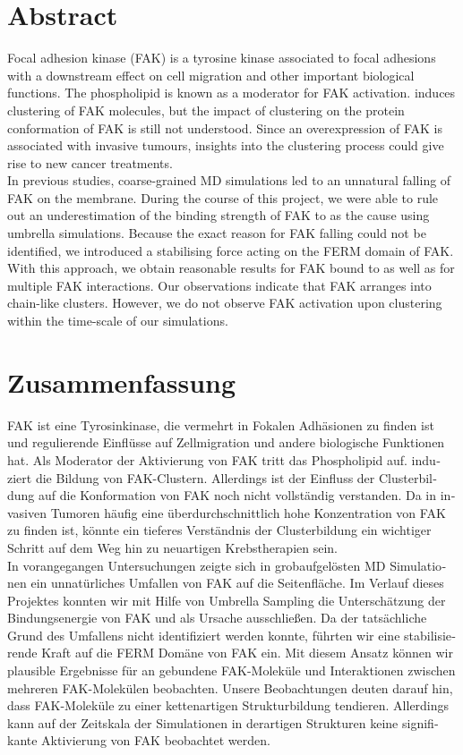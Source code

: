 \chapter*{Abstract}
Focal adhesion kinase (FAK) is a tyrosine kinase associated to focal adhesions with a downstream effect on cell migration and other important biological functions. The phospholipid \pip{} is known as a moderator for FAK activation. \pip{} induces clustering of FAK molecules, but the impact of clustering on the protein conformation of FAK is still not understood. Since an overexpression of FAK is associated with invasive tumours, insights into the clustering process could give rise to new cancer treatments.\\
In previous studies, coarse-grained MD simulations led to an unnatural falling of FAK on the membrane. During the course of this project, we were able to rule out an underestimation of the binding strength of FAK to \pip{} as the cause using umbrella simulations. Because the exact reason for FAK falling could not be identified, we introduced a stabilising force acting on the FERM domain of FAK. With this approach, we obtain reasonable results for FAK bound to \pip{} as well as for multiple FAK interactions. Our observations indicate that FAK arranges into chain-like clusters. However, we do not observe FAK activation upon clustering within the time-scale of our simulations.
\newpage
\leavevmode\thispagestyle{plain}\newpage
\chapter*{Zusammenfassung}
\begin{german}
	FAK ist eine Tyrosinkinase, die vermehrt in Fokalen Adhäsionen zu finden ist und regulierende Einflüsse auf Zellmigration und andere biologische Funktionen hat. Als Moderator der Aktivierung von FAK tritt das Phospholipid \pip{} auf. \pip{} induziert die Bildung von FAK-Clustern. Allerdings ist der Einfluss der Clusterbildung auf die Konformation von FAK noch nicht vollständig verstanden. Da in invasiven Tumoren häufig eine überdurchschnittlich hohe Konzentration von FAK zu finden ist, könnte ein tieferes Verständnis der Clusterbildung ein wichtiger Schritt auf dem Weg hin zu neuartigen Krebstherapien sein.\\
	In vorangegangen Untersuchungen zeigte sich in grobaufgelösten MD Simulationen ein unnatürliches Umfallen von FAK auf die Seitenfläche. Im Verlauf dieses Projektes konnten wir mit Hilfe von Umbrella Sampling die Unterschätzung der Bindungsenergie von FAK und \pip{} als Ursache ausschließen. Da der tatsächliche Grund des Umfallens nicht identifiziert werden konnte, führten wir eine stabilisierende Kraft auf die FERM Domäne von FAK ein. Mit diesem Ansatz können wir plausible Ergebnisse für an \pip{} gebundene FAK-Moleküle und Interaktionen zwischen mehreren FAK-Molekülen beobachten. Unsere Beobachtungen deuten darauf hin, dass FAK-Moleküle zu einer kettenartigen Strukturbildung tendieren. Allerdings kann auf der Zeitskala der Simulationen in derartigen Strukturen keine signifikante Aktivierung von FAK beobachtet werden.
\end{german}
